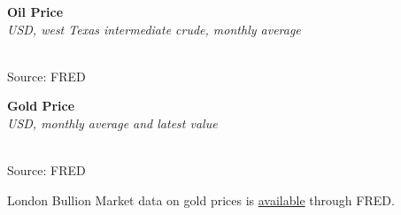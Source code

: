 \documentclass{report}
\makeatletter
\newcommand{\tbllink}[1]{\href{https://raw.githubusercontent.com/bdecon/US-chartbook/master/chartbook/data/#1}{\faTable}}
\newcommand*\short[1]{\expandafter\@gobbletwo\number\numexpr#1\relax}
\newcommand{\dateaxisticks}{
		date coordinates in=x, axis line style={draw=none},
		xmax={2020-05-10},
		max space between ticks=40,	    
		xtick={{1990-01-01}, {1992-01-01}, {1994-01-01}, 
			{1996-01-01}, {1998-01-01}, {2000-01-01}, 
			{2002-01-01}, {2004-01-01}, {2006-01-01},
			{2008-01-01}, {2010-01-01}, {2012-01-01}, {2014-01-01},
		    {2016-01-01}, {2018-01-01}, {2020-01-01}},
		minor xtick={{1989-01-01}, {1991-01-01}, {1993-01-01},
			{1995-01-01}, {1997-01-01}, {1999-01-01}, 
			{2001-01-01}, {2003-01-01}, {2005-01-01}, {2007-01-01},
		    {2009-01-01}, {2011-01-01}, {2013-01-01}, {2015-01-01},
		    {2017-01-01}, {2019-01-01}},
		enlarge y limits={0.06}, enlarge x limits={0.01},
		}
\newcommand{\shdateaxisticks}{
		date coordinates in=x, axis line style={draw=none},
		xmax={2021-02-01},
		max space between ticks=40,	    
		xtick={{1990-01-01}, {1995-01-01}, {2000-01-01}, 
			{2005-01-01}, {2010-01-01}, {2015-01-01}, {2020-01-01}},
		minor xtick={},
		enlarge y limits={0.06}, enlarge x limits={0.01},
		}
\newcommand{\bbar}[2]{extra #1 ticks = {{#2}}, extra #1 tick labels = ,
		extra #1 tick style = {grid=major, grid style={thick, black!25}},}
\newcommand{\stdline}[4]{\addplot[very thick, no markers, color=#1] 
		table [x=#2, y=#3, col sep=comma] {#4};	}
\newcommand{\rbars}{
		\fill[color=black!10] (axis cs:{1990-07-01},\pgfkeysvalueof{/pgfplots/ymin}) rectangle 
			(axis cs:{1991-03-01}, \pgfkeysvalueof{/pgfplots/ymax});
		\fill[color=black!10] (axis cs:{2007-12-01},\pgfkeysvalueof{/pgfplots/ymin}) rectangle 
			(axis cs:{2009-07-01}, \pgfkeysvalueof{/pgfplots/ymax});
		\fill[color=black!10] (axis cs:{2001-03-01},\pgfkeysvalueof{/pgfplots/ymin}) rectangle 
			(axis cs:{2001-11-01}, \pgfkeysvalueof{/pgfplots/ymax});}
\makeatother
\begin{document}
{{{{{{{{{\begin{minipage}{0.76\textwidth}
\vspace{1mm}

\noindent \normalsize \textbf{Oil Price}\\
\footnotesize{\textit{USD, west Texas intermediate crude, monthly average}}\\ 
\noindent \hspace*{-2mm} \\
\footnotesize{Source: FRED} \hfill \tbllink{wti.csv}\\

\end{minipage}

\vspace{10mm}

\begin{minipage}{0.41\textwidth}
\noindent \normalsize \textbf{Gold Price}\\
\footnotesize{\textit{USD, monthly average and latest value}}\\ 
\noindent \hspace*{-2mm} \\
\footnotesize{Source: FRED} \hfill \tbllink{gold.csv}\\
\end{minipage} \hspace{8mm}
\begin{minipage}{0.29\textwidth}
\small London Bullion Market data on gold prices is \href{https://fred.stlouisfed.org/series/GOLDAMGBD228NLBM}{available} through FRED. 
\end{minipage}


\newpage
\begin{minipage}{0.76\textwidth}



\end{minipage}}}}}}}}}}
\end{document}
